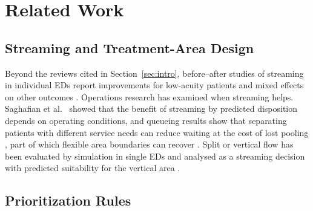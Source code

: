 \section{Related Work}
\label{sec:lit}

\subsection{Streaming and Treatment-Area Design}

Beyond the reviews cited in Section~\ref{sec:intro}, before--after studies of streaming in individual EDs report improvements for low-acuity patients \cite{Kinsman2008,King2006} and mixed effects on other outcomes \cite{StreamingINED_2015_Kim_etal}. Operations research has examined when streaming helps. Saghafian et al.\ \cite{Saghafian2012_Streaming_as_a_Mechanism} showed that the benefit of streaming by predicted disposition depends on operating conditions, and queueing results show that separating patients with different service needs can reduce waiting at the cost of lost pooling \cite{Whitt1999,Hu2009}, part of which flexible area boundaries can recover \cite{laker2014flex_track}. Split or vertical flow has been evaluated by simulation in single EDs \cite{Konrad2013_SplitFlowSim} and analysed as a streaming decision with predicted suitability for the vertical area \cite{feizi2023vertical}.

\subsection{Prioritization Rules}

